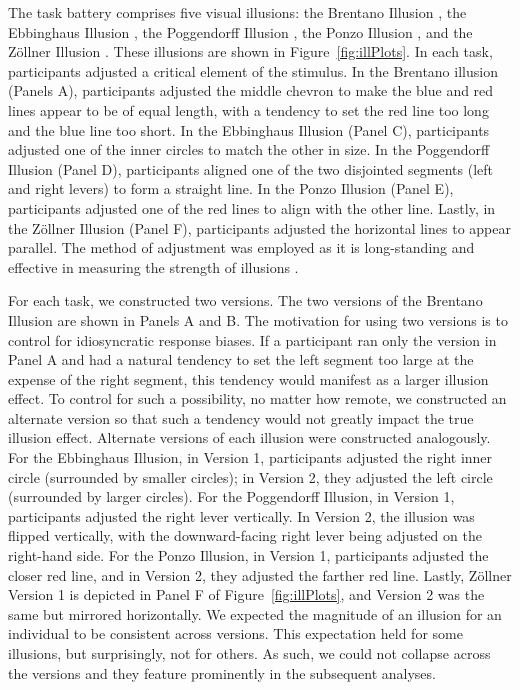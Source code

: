 \documentclass[man, 12pt]{apa7} %
\begin{document}
The task battery comprises five visual illusions: the Brentano Illusion \parencite{Brentano.1892}, the Ebbinghaus Illusion \parencite[]{Ebbinghaus.1913}, the Poggendorff Illusion \parencite[]{Day.Dickinson.1976}, the Ponzo Illusion \parencite[]{Ponzo.1910}, and the Zöllner Illusion \parencite[]{Judd.Courten.1905}. These illusions are shown in Figure~\ref{fig:illPlots}. In each task, participants adjusted a critical element of the stimulus. In the Brentano illusion (Panels A), participants adjusted the middle chevron to make the blue and red lines appear to be of equal length, with a tendency to set the red line too long and the blue line too short. In the Ebbinghaus Illusion (Panel C), participants adjusted one of the inner circles to match the other in size. In the Poggendorff Illusion (Panel D), participants aligned one of the two disjointed segments (left and right levers) to form a straight line. In the Ponzo Illusion (Panel E), participants adjusted one of the red lines to align with the other line. Lastly, in the Zöllner Illusion (Panel F), participants adjusted the horizontal lines to appear parallel. The method of adjustment was employed as it is long-standing \parencite{Fechner.1860} and effective in measuring the strength of illusions \parencite[]{Cretenoud.etal.2021}.

For each task, we constructed two versions. The two versions of the Brentano Illusion are shown in Panels A and B. The motivation for using two versions is to control for idiosyncratic response biases. If a participant ran only the version in Panel A and had a natural tendency to set the left segment too large at the expense of the right segment, this tendency would manifest as a larger illusion effect. To control for such a possibility, no matter how remote, we constructed an alternate version so that such a tendency would not greatly impact the true illusion effect. Alternate versions of each illusion were constructed analogously. For the Ebbinghaus Illusion, in Version 1, participants adjusted the right inner circle (surrounded by smaller circles); in Version 2, they adjusted the left circle (surrounded by larger circles). For the Poggendorff Illusion, in Version 1, participants adjusted the right lever vertically. In Version 2, the illusion was flipped vertically, with the downward-facing right lever being adjusted on the right-hand side. For the Ponzo Illusion, in Version 1, participants adjusted the closer red line, and in Version 2, they adjusted the farther red line. Lastly, Zöllner Version 1 is depicted in Panel F of Figure~\ref{fig:illPlots}, and Version 2 was the same but mirrored horizontally. We expected the magnitude of an illusion for an individual to be consistent across versions. This expectation held for some illusions, but surprisingly, not for others. As such, we could not collapse across the versions and they feature prominently in the subsequent analyses.
\end{document}
